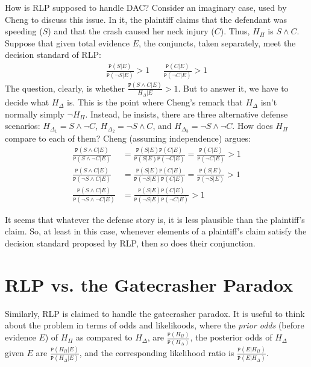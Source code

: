 \documentclass{ifcolog}
\newcommand{\pr}[1]{\mbox{$\mathtt{P}(#1)$}}
\newcommand{\n}{\neg}
\newcommand{\et}{\wedge}
\begin{document}
How is RLP supposed to handle DAC? Consider an imaginary case, used by Cheng to discuss this issue. In it, the plaintiff claims that the defendant was speeding ($S$) and that
the crash caused her neck injury ($C$). Thus, $H_\Pi$ is $S\et C$. Suppose that  given total evidence $E$, the conjuncts, taken separately, meet the decision standard of RLP:
\begin{align}
 \nonumber 
 \frac{\pr{S\vert E}}{\pr{\n S \vert E}} > 1   & & \frac{\pr{C\vert E}}{\pr{\n C \vert E}} > 1
\end{align}
\noindent The question, clearly, is whether $\frac{\mathtt{P}(S\et C\vert E)}{H_\Delta \vert E}>1$. But to answer it, we have to decide what $H_\Delta$ is. This is the point where Cheng's remark that $H_\Delta$ isn't normally simply $\n H_\Pi$. Instead, he insists, there are three alternative defense scenarios: $H_{\Delta_1}= S\et \n C$, $H_{\Delta_2}=\n S \et C$, and  $H_{\Delta_3}=\n S \et \n C$. How does $H_\Pi$ compare to each of them? Cheng (assuming independence) argues:
\begin{align}\label{eq:cheng-multiplication}
\frac{\pr{S\et C\vert E}}{\pr{S\et \n C\vert E}} & = \frac{\pr{S\vert E}\pr{C\vert E}}{\pr{S \vert E}\pr{\n C \vert E}}  =\frac{\pr{C\vert E}}{\pr{\n C \vert E}} > 1 \\
\nonumber
\frac{\pr{S\et C\vert E}}{\pr{\n S\et C\vert E}} & = \frac{\pr{S\vert E}\pr{C\vert E}}{\pr{\n S \vert E}\pr{C\vert E}}  = \frac{\pr{S\vert E}}{\pr{\n S \vert E}} > 1 \\
\nonumber
\frac{\pr{S\et C\vert E}}{\pr{\n S\et \n C\vert E}} & = \frac{\pr{S\vert E}\pr{C\vert E}}{\pr{\n S \vert E}\pr{\n C \vert E}}   > 1 
\end{align}

\noindent It seems that whatever the defense story is, it is less plausible than the plaintiff's claim. So, at least in this case, whenever elements of a plaintiff's claim satisfy the decision standard proposed by RLP, then so does their conjunction. 


 \section{RLP vs. the Gatecrasher Paradox}\label{sec:RLP_vs_Gatecrasher}

 Similarly, RLP is claimed to handle the gatecrasher paradox.  It is useful to think about the problem in terms of odds and likelikoods, where the \emph{prior odds} (before evidence $E$) of $H_\Pi$  as compared to $H_\Delta$, are $\frac{\pr{H_\Pi}}{\pr{H_\Delta}}$, the posterior odds of $H_\Delta$ given $E$ are $\frac{\pr{H_\Pi \vert E}}{\pr{H_\Delta \vert E}}$, and the corresponding likelihood ratio is $\frac{\pr{E\vert H_\Pi}}{\pr{E\vert H_\Delta}}$. 
\end{document}
